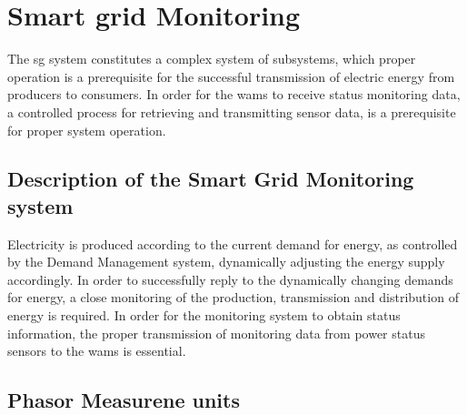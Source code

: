 \section{Smart grid Monitoring}
The \acrlong{sg} system constitutes a complex system of subsystems, which proper operation is a prerequisite for the successful transmission of electric energy from producers to consumers. 
In order for the \acrshort{wams} to receive status monitoring data, a controlled process for retrieving and transmitting sensor data, is a prerequisite for proper system operation.



\subsection{Description of the Smart Grid  Monitoring system}
Electricity is produced according to the current demand for energy, as controlled by the Demand Management system, dynamically adjusting the energy supply accordingly. In order to successfully reply to the dynamically changing demands for energy, a close monitoring of the production, transmission and distribution of energy is required. In order for the monitoring system to obtain status information, the proper transmission of monitoring data from power status sensors to the   \acrshort{wams}  is essential.



\subsection{Phasor Measurene units}



